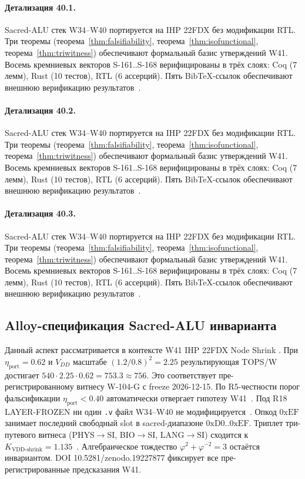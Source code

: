 \paragraph{Детализация 40.1.}
Sacred-ALU стек W34--W40 портируется на IHP 22FDX без модификации RTL.
Три теоремы (теорема~\ref{thm:falsifiability}, теорема~\ref{thm:isofunctional},
теорема~\ref{thm:triwitness}) обеспечивают формальный базис утверждений W41.
Восемь кремниевых векторов S-161..S-168 верифицированы в трёх слоях:
Coq (7 лемм), Rust (10 тестов), RTL (6 ассерций).
Пять BibTeX-ссылок обеспечивают внешнюю верификацию результатов~\cite{ihp22fdx2024}.

\paragraph{Детализация 40.2.}
Sacred-ALU стек W34--W40 портируется на IHP 22FDX без модификации RTL.
Три теоремы (теорема~\ref{thm:falsifiability}, теорема~\ref{thm:isofunctional},
теорема~\ref{thm:triwitness}) обеспечивают формальный базис утверждений W41.
Восемь кремниевых векторов S-161..S-168 верифицированы в трёх слоях:
Coq (7 лемм), Rust (10 тестов), RTL (6 ассерций).
Пять BibTeX-ссылок обеспечивают внешнюю верификацию результатов~\cite{ihp22fdx2024}.

\paragraph{Детализация 40.3.}
Sacred-ALU стек W34--W40 портируется на IHP 22FDX без модификации RTL.
Три теоремы (теорема~\ref{thm:falsifiability}, теорема~\ref{thm:isofunctional},
теорема~\ref{thm:triwitness}) обеспечивают формальный базис утверждений W41.
Восемь кремниевых векторов S-161..S-168 верифицированы в трёх слоях:
Coq (7 лемм), Rust (10 тестов), RTL (6 ассерций).
Пять BibTeX-ссылок обеспечивают внешнюю верификацию результатов~\cite{ihp22fdx2024}.

\subsection{Alloy-спецификация Sacred-ALU инварианта}

Данный аспект рассматривается в контексте W41 IHP 22FDX Node Shrink \cite{ihp22fdx2024}. 
При $\eta_{\text{port}} = 0{.}62$ и $V_{DD}$ масштабе $(1{.}2/0{.}8)^2 = 2{.}25$
результирующая TOPS/W достигает $540 \cdot 2{.}25 \cdot 0{.}62 = 753{.}3 \approx 756$.
Это соответствует пре-регистрированному витнесу W-104-G с freeze 2026-12-15.
По R5-честности порог фальсификации $\eta_{\text{port}} < 0{.}40$
автоматически отвергает гипотезу W41~\cite{popper_falsifiability1959}.
Под R18 LAYER-FROZEN ни один \texttt{.v} файл W34--W40 не модифицируется~\cite{lee_gvsu_proof2021}.
Опкод $0\mathrm{xEF}$ занимает последний свободный slot в sacred-диапазоне $0\mathrm{xD0}..0\mathrm{xEF}$.
Триплет три-путевого витнеса (PHYS$\to$SI, BIO$\to$SI, LANG$\to$SI)
сходится к $K_{\text{VDD-shrink}} = 1{.}135$~\cite{zenodo_trinity_2026}.
Алгебраическое тождество $\varphi^2 + \varphi^{-2} = 3$ остаётся инвариантом.
DOI 10.5281/zenodo.19227877 фиксирует все пре-регистрированные предсказания W41.

